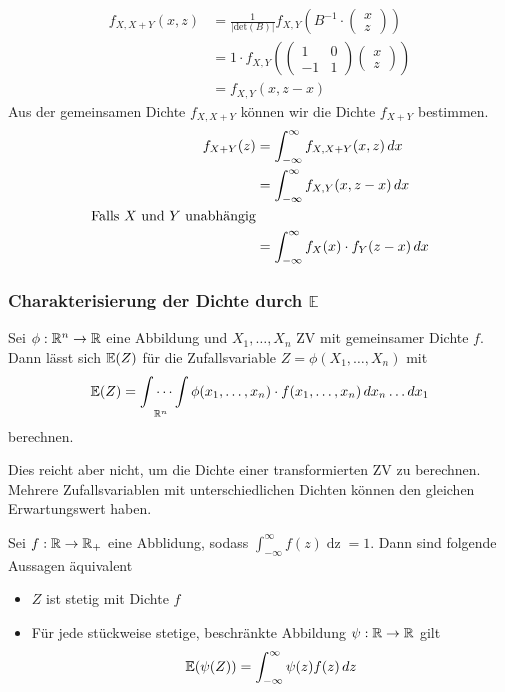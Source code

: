 \begin{align*}
    f_{X, X+Y}(x, z) &= \frac{1}{|\text{det}(B)|}f_{X, Y}\left(B^{-1}\cdot 
    \left(\begin{matrix}
        x\\
        z
    \end{matrix}\right)\right)\\
    &= 1 \cdot f_{X, Y}\left(\left(\begin{matrix}
        1 & 0\\
        -1 & 1
    \end{matrix}\right)\left(\begin{matrix}
        x\\
        z
    \end{matrix}\right)\right)\\
    &= f_{X, Y}\left(x, z-x\right)
\end{align*}
Aus der gemeinsamen Dichte $f_{X, X + Y}$ können wir die Dichte $f_{X + Y}$ bestimmen.
\begin{align*}
    f_{X+Y}(z) &= \int_{-\infty}^{\infty}f_{X, X + Y}(x, z) \mathop{dx}\\
    &= \int_{-\infty}^{\infty} f_{X,Y}(x, z-x) \mathop{dx}\\
    \text{Falls $X$ und $Y$ unabhängig}\\
    &= \int_{-\infty}^{\infty}f_X(x)\cdot f_Y(z-x) \mathop{dx}
\end{align*}
\subsubsection{Charakterisierung der Dichte durch \(\mathbb{E}\)}
    Sei $\phi: \mathbb{R}^n \to \mathbb{R}$ eine Abbildung und $X_1, \ldots, X_n$ ZV mit gemeinsamer Dichte $f$. 
    Dann lässt sich $\mathbb{E}(Z)$ für die Zufallsvariable $Z=\phi(X_1, \ldots, X_n)$ mit 
    $$\mathbb{E}(Z) =\idotsint\limits_{\mathbb{R}^n}\phi(x_1, \ldots, x_n)\cdot f(x_1, \ldots, x_n)\mathop{dx_n}\ldots\mathop{dx_1}$$
    berechnen.

Dies reicht aber nicht, um die Dichte einer transformierten ZV zu berechnen. Mehrere Zufallsvariablen mit unterschiedlichen Dichten können den gleichen Erwartungswert haben.

\begin{subbox}{}
    Sei $f: \mathbb{R} \to \mathbb{R}_+$ eine Abblidung, sodass $\int_{-\infty}^{\infty}f(z)\mathop{dz} = 1$. Dann sind folgende Aussagen äquivalent
    \begin{itemize}
        \item $Z$ ist stetig mit Dichte $f$
        \item Für jede stückweise stetige, beschränkte Abbildung $\psi: \mathbb{R} \to \mathbb{R}$ gilt 
        \[\mathbb{E}(\psi(Z)) = \int_{-\infty}^{\infty}\psi(z)f(z)\mathop{dz}\]
    \end{itemize}
\end{subbox}



